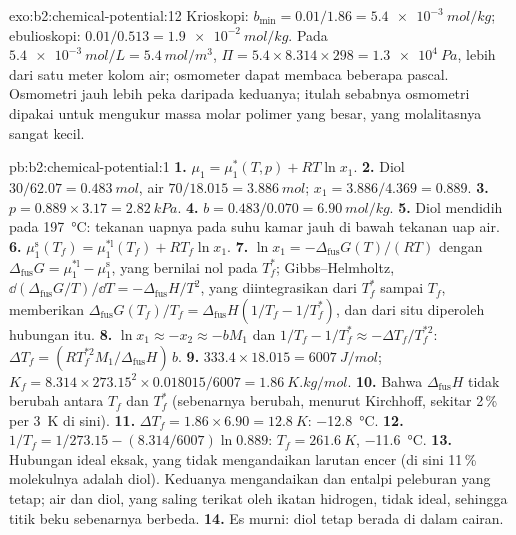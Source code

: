 \begin{solution}{exo:b2:chemical-potential:12}
Krioskopi: $b_{\min} = 0.01/1.86 = \qty{5.4e-3}{mol/kg}$; ebulioskopi:
$0.01/0.513 = \qty{1.9e-2}{mol/kg}$. Pada $\qty{5.4e-3}{mol/L} =
\qty{5.4}{mol/m^3}$, $\Pi = 5.4 \times 8.314 \times 298 = \qty{1.3e4}{Pa}$,
lebih dari satu meter kolom air; osmometer dapat membaca beberapa pascal.
Osmometri jauh lebih peka daripada keduanya; itulah sebabnya osmometri
dipakai untuk mengukur massa molar polimer yang besar, yang molalitasnya
sangat kecil.
\end{solution}

\begin{solution}{pb:b2:chemical-potential:1}
\textbf{1.} $\mu_1 = \mu_1^*(T, p) + RT\ln x_1$.
\textbf{2.} Diol $30/62.07 = \qty{0.483}{mol}$, air $70/18.015 =
\qty{3.886}{mol}$; $x_1 = 3.886/4.369 = 0.889$.
\textbf{3.} $p = 0.889 \times 3.17 = \qty{2.82}{kPa}$.
\textbf{4.} $b = 0.483/0.070 = \qty{6.90}{mol/kg}$.
\textbf{5.} Diol mendidih pada \qty{197}{\celsius}: tekanan uapnya pada
suhu kamar jauh di bawah tekanan uap air.
\textbf{6.} $\mu_1^{\text{s}}(T_f) = \mu_1^{*\text{l}}(T_f) + RT_f\ln x_1$.
\textbf{7.} $\ln x_1 = -\Delta_{\text{fus}}G(T)/(RT)$ dengan
$\Delta_{\text{fus}}G = \mu_1^{*\text{l}} - \mu_1^{\text{s}}$, yang bernilai
nol pada $T_f^*$; Gibbs--Helmholtz,
$\dd(\Delta_{\text{fus}}G/T)/\dd T = -\Delta_{\text{fus}}H/T^2$, yang
diintegrasikan dari $T_f^*$ sampai $T_f$, memberikan
$\Delta_{\text{fus}}G(T_f)/T_f =
\Delta_{\text{fus}}H(1/T_f - 1/T_f^*)$,
dan dari situ diperoleh hubungan itu.
\textbf{8.} $\ln x_1 \approx -x_2 \approx -bM_1$ dan $1/T_f - 1/T_f^* \approx
-\Delta T_f/T_f^{*2}$: $\Delta T_f = (RT_f^{*2}M_1/\Delta_{\text{fus}}H)\,b$.
\textbf{9.} $333.4 \times 18.015 = \qty{6007}{J/mol}$; $K_f = 8.314 \times
273.15^2 \times 0.018015/6007 = \qty{1.86}{K.kg/mol}$.
\textbf{10.} Bahwa $\Delta_{\text{fus}}H$ tidak berubah antara $T_f$ dan
$T_f^*$ (sebenarnya berubah, menurut Kirchhoff, sekitar 2\,\% per
\qty{3}{K} di sini).
\textbf{11.} $\Delta T_f = 1.86 \times 6.90 = \qty{12.8}{K}$:
\qty{-12.8}{\celsius}.
\textbf{12.} $1/T_f = 1/273.15 - (8.314/6007)\ln 0.889$:
$T_f = \qty{261.6}{K}$, \qty{-11.6}{\celsius}.
\textbf{13.} Hubungan ideal eksak, yang tidak mengandaikan larutan encer
(di sini 11\,\% molekulnya adalah diol). Keduanya mengandaikan  dan entalpi peleburan yang tetap; air dan diol, yang saling terikat
oleh ikatan hidrogen, tidak ideal, sehingga titik beku sebenarnya
berbeda.
\textbf{14.} Es murni: diol tetap berada di dalam cairan.

\end{solution}
